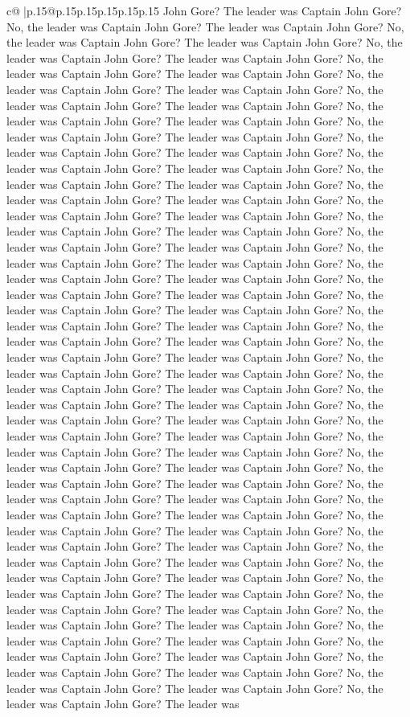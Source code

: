 \documentclass{article}
\begin{document}
{\begin{supertabular}{c@{$\;$}|p{.15\linewidth}@{}p{.15\linewidth}p{.15\linewidth}p{.15\linewidth}p{.15\linewidth}p{.15\linewidth}}
{{{John Gore? The leader was Captain John Gore? No, the leader was Captain John Gore? The leader was Captain John Gore? No, the leader was Captain John Gore? The leader was Captain John Gore? No, the leader was Captain John Gore? The leader was Captain John Gore? No, the leader was Captain John Gore? The leader was Captain John Gore? No, the leader was Captain John Gore? The leader was Captain John Gore? No, the leader was Captain John Gore? The leader was Captain John Gore? No, the leader was Captain John Gore? The leader was Captain John Gore? No, the leader was Captain John Gore? The leader was Captain John Gore? No, the leader was Captain John Gore? The leader was Captain John Gore? No, the leader was Captain John Gore? The leader was Captain John Gore? No, the leader was Captain John Gore? The leader was Captain John Gore? No, the leader was Captain John Gore? The leader was Captain John Gore? No, the leader was Captain John Gore? The leader was Captain John Gore? No, the leader was Captain John Gore? The leader was Captain John Gore? No, the leader was Captain John Gore? The leader was Captain John Gore? No, the leader was Captain John Gore? The leader was Captain John Gore? No, the leader was Captain John Gore? The leader was Captain John Gore? No, the leader was Captain John Gore? The leader was Captain John Gore? No, the leader was Captain John Gore? The leader was Captain John Gore? No, the leader was Captain John Gore? The leader was Captain John Gore? No, the leader was Captain John Gore? The leader was Captain John Gore? No, the leader was Captain John Gore? The leader was Captain John Gore? No, the leader was Captain John Gore? The leader was Captain John Gore? No, the leader was Captain John Gore? The leader was Captain John Gore? No, the leader was Captain John Gore? The leader was Captain John Gore? No, the leader was Captain John Gore? The leader was Captain John Gore? No, the leader was Captain John Gore? The leader was Captain John Gore? No, the leader was Captain John Gore? The leader was Captain John Gore? No, the leader was Captain John Gore? The leader was Captain John Gore? No, the leader was Captain John Gore? The leader was Captain John Gore? No, the leader was Captain John Gore? The leader was Captain John Gore? No, the leader was Captain John Gore? The leader was Captain John Gore? No, the leader was Captain John Gore? The leader was Captain John Gore? No, the leader was Captain John Gore? The leader was Captain John Gore? No, the leader was Captain John Gore? The leader was Captain John Gore? No, the leader was Captain John Gore? The leader was Captain John Gore? No, the leader was Captain John Gore? The leader was Captain John Gore? No, the leader was Captain John Gore? The leader was Captain John Gore? No, the leader was Captain John Gore? The leader was Captain John Gore? No, the leader was Captain John Gore? The leader was Captain John Gore? No, the leader was Captain John Gore? The leader was Captain John Gore? No, the leader was Captain John Gore? The leader was Captain John Gore? No, the leader was Captain John Gore? The leader was Captain John Gore? No, the leader was Captain John Gore? The leader was }}}
\end{supertabular}}
\end{document}

